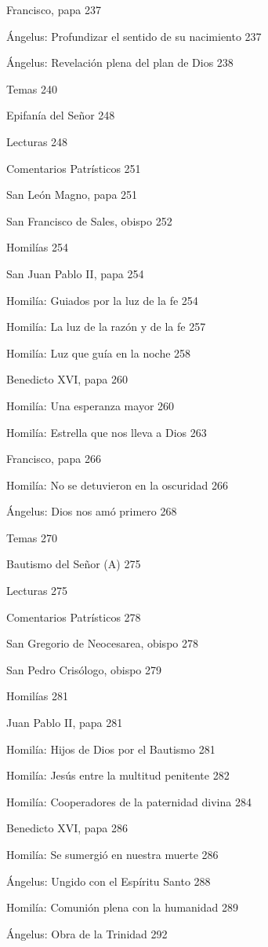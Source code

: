 \documentclass[]{article}
\begin{document}
Francisco, papa 237

Ángelus: Profundizar el sentido de su nacimiento 237

Ángelus: Revelación plena del plan de Dios 238

Temas 240

Epifanía del Señor 248

Lecturas 248

Comentarios Patrísticos 251

San León Magno, papa 251

San Francisco de Sales, obispo 252

Homilías 254

San Juan Pablo II, papa 254

Homilía: Guiados por la luz de la fe 254

Homilía: La luz de la razón y de la fe 257

Homilía: Luz que guía en la noche 258

Benedicto XVI, papa 260

Homilía: Una esperanza mayor 260

Homilía: Estrella que nos lleva a Dios 263

Francisco, papa 266

Homilía: No se detuvieron en la oscuridad 266

Ángelus: Dios nos amó primero 268

Temas 270

Bautismo del Señor (A) 275

Lecturas 275

Comentarios Patrísticos 278

San Gregorio de Neocesarea, obispo 278

San Pedro Crisólogo, obispo 279

Homilías 281

Juan Pablo II, papa 281

Homilía: Hijos de Dios por el Bautismo 281

Homilía: Jesús entre la multitud penitente 282

Homilía: Cooperadores de la paternidad divina 284

Benedicto XVI, papa 286

Homilía: Se sumergió en nuestra muerte 286

Ángelus: Ungido con el Espíritu Santo 288

Homilía: Comunión plena con la humanidad 289

Ángelus: Obra de la Trinidad 292
\end{document}
